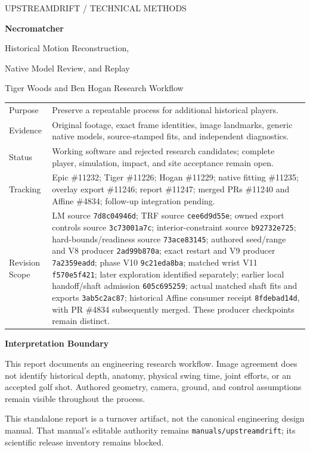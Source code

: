\documentclass[11pt,letterpaper]{article}
\newcommand{\code}[1]{\nolinkurl{#1}}
\begin{document}
\hypersetup{pageanchor=false}
\begin{titlepage}
\thispagestyle{empty}
\vspace*{0.7in}
{\large\textcolor{accent}{UPSTREAMDRIFT / TECHNICAL METHODS}}\par
\vspace{0.3in}
{\Huge\bfseries\textcolor{ink}{Necromatcher}}\par
\vspace{0.18in}
{\LARGE Historical Motion Reconstruction,\par Native Model Review, and Replay}\par
\vspace{0.35in}
{\large Tiger Woods and Ben Hogan Research Workflow}\par
\vspace{0.45in}
\begin{tabular}{@{}p{1.35in}p{4.5in}@{}}
\toprule
Purpose & Preserve a repeatable process for additional historical players.\\
Evidence & Original footage, exact frame identities, image landmarks, generic native models, source-stamped fits, and independent diagnostics.\\
Status & Working software and rejected research candidates; complete player, simulation, impact, and site acceptance remain open.\\
Tracking & Epic \#11232; Tiger \#11226; Hogan \#11229; native fitting \#11235; overlay export \#11246; report \#11247; merged PRs \#11240 and Affine \#4834; follow-up integration pending.\\
Revision Scope & LM source \code{7d8c04946d}; TRF source \code{cee6d9d55e}; owned export controls source \code{3c73001a7c}; interior-constraint source \code{b92732e725}; hard-bounds/readiness source \code{73ace83145}; authored seed/range and V8 producer \code{2ad99b870a}; exact restart and V9 producer \code{7a2359eadd}; phase V10 \code{9c21eda8ba}; matched wrist V11 \code{f570e5f421}; later exploration identified separately; earlier local handoff/shaft admission \code{605c695259}; actual matched shaft fits and exports \code{3ab5c2ac87}; historical Affine consumer receipt \code{8fdebad14d}, with PR \#4834 subsequently merged. These producer checkpoints remain distinct.\\
\bottomrule
\end{tabular}
\vfill
\textcolor{warning}{\textbf{Interpretation Boundary}}\par
This report documents an engineering research workflow. Image agreement does
not identify historical depth, anatomy, physical swing time, joint efforts, or
an accepted golf shot. Authored geometry, camera, ground, and control assumptions
remain visible throughout the process.

\vspace{0.2in}
This standalone report is a turnover artifact, not the canonical engineering
design manual. That manual's editable authority remains
\code{manuals/upstreamdrift}; its scientific release inventory remains blocked.
\end{titlepage}
\hypersetup{pageanchor=true}
\end{document}
